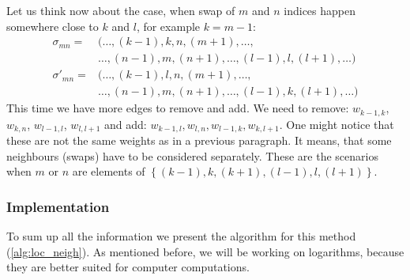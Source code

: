 		Let us think now about the case, when swap of $m$ and $n$ indices happen somewhere close to $k$ and $l$, for example $k = m-1$:
		\begin{align*}
			\sigma_{mn} = &(\ldots, (k-1), k, n, (m+1), \ldots, \\
			&\ldots, (n-1), m,( n+1), \ldots, (l-1), l, (l+1), \ldots) \\
			\sigma'_{mn} = &(\ldots, (k-1), l, n, (m+1), \ldots, \\
			& \ldots, (n-1), m, (n+1), \ldots, (l-1), k, (l+1), \ldots)
		\end{align*}
		This time we have more edges to remove and add. We need to remove: $w_{k-1, k}$, $w_{k, n}$, $w_{l-1, l}$, $w_{l, l+1}$ and add: $w_{k-1, l}, w_{l, n}, w_{l-1, k}, w_{k, l+1}$. One might notice that these are not the same weights as in a previous paragraph. It means, that some neighbours (swaps) have to be considered separately. These are the scenarios when $m$ or $n$ are elements of $\left\{ (k-1), k, (k+1), (l-1), l, (l+1) \right\}$.
	
	\subsubsection{Implementation}
		To sum up all the information we present the algorithm for this method (\ref{alg:loc_neigh}). As mentioned before, we will be working on logarithms, because they are better suited for computer computations.
		
